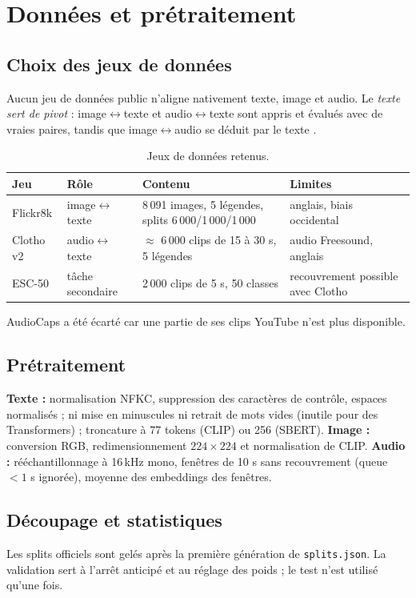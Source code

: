 \section{Données et prétraitement}\label{sec:donnees}
\subsection{Choix des jeux de données}
Aucun jeu de données public n'aligne nativement texte, image et audio. Le \emph{texte sert de pivot} :
image$\leftrightarrow$texte et audio$\leftrightarrow$texte sont appris et évalués avec de vraies paires, tandis que
image$\leftrightarrow$audio se déduit par le texte \cite{girdhar2023imagebind}.
\begin{table}[ht]\centering\small
\begin{tabular}{@{}llp{4.2cm}p{4.2cm}@{}}
\toprule
Jeu & Rôle & Contenu & Limites\\
\midrule
Flickr8k \cite{hodosh2013flickr} & image$\leftrightarrow$texte & 8\,091 images, 5 légendes, splits 6\,000/1\,000/1\,000 & anglais, biais occidental\\
Clotho v2 \cite{drossos2020clotho} & audio$\leftrightarrow$texte & $\approx$ 6\,000 clips de 15 à 30 s, 5 légendes & audio Freesound, anglais\\
ESC-50 \cite{piczak2015esc} & tâche secondaire & 2\,000 clips de 5 s, 50 classes & recouvrement possible avec Clotho\\
\bottomrule
\end{tabular}
\caption{Jeux de données retenus. }
\end{table}
AudioCaps a été écarté car une partie de ses clips YouTube n'est plus disponible.

\subsection{Prétraitement}
\textbf{Texte :} normalisation NFKC, suppression des caractères de contrôle, espaces normalisés ; ni mise en minuscules
ni retrait de mots vides (inutile pour des Transformers) ; troncature à 77 tokens (CLIP) ou 256 (SBERT).
\textbf{Image :} conversion RGB, redimensionnement $224\times224$ et normalisation de CLIP.
\textbf{Audio :} rééchantillonnage à 16\,kHz mono, fenêtres de 10 s sans recouvrement (queue $<1$ s ignorée), moyenne des
embeddings des fenêtres.

\subsection{Découpage et statistiques}
Les splits officiels sont gelés après la première génération de \texttt{splits.json}. La validation sert à l'arrêt
anticipé et au réglage des poids ; le test n'est utilisé qu'une fois.
